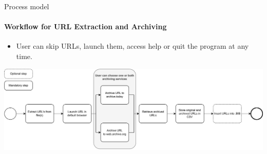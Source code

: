 \documentclass[
    ngerman,%
    authorontitle=true,
]{bfhbeamer}
\begin{document}
    \begin{frame}{Process model}
        \framesubtitle{Workflow for URL Extraction and Archiving}
        \begin{itemize}
            \item User can skip URLs, launch them, access help or quit the program at any time.
        \end{itemize}
        \vspace{0.8cm}
        \includegraphics[width=1\textwidth]{pictures/process_model-simple}
    \end{frame}
\end{document}
